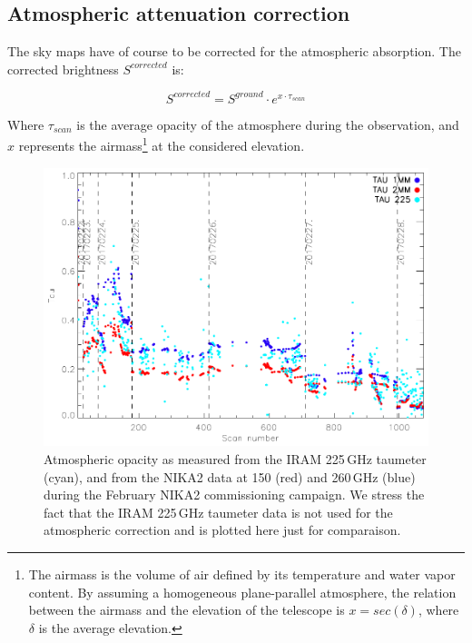 \documentclass[]{aa} %
\begin{document}
\subsection{Atmospheric attenuation correction}
\label{Atmospheric attenuation correction}

The sky maps have of course to be corrected for the atmospheric absorption. The corrected brightness $S^{corrected}$ is:

\begin{equation}
S^{corrected} =  S^{ground} \cdot e^{ x \cdot \tau_{scan}}
\end{equation}

Where $\tau_{scan}$ is the average opacity of the atmosphere during the observation, and $x$ represents the airmass\footnote{The airmass is the volume of air defined by its temperature and water vapor content. By assuming a homogeneous plane-parallel atmosphere, the relation between the airmass and the elevation of the telescope is $x = sec(\delta)$, where $\delta$ is the average elevation.} at the considered elevation.

\begin{figure}
\includegraphics[scale=0.55]{./opacity_evol_run22.pdf}
\caption{Atmospheric opacity as measured from the IRAM 225\,GHz taumeter (cyan), and from the NIKA2 data at 150 (red) and 260\,GHz (blue) during the February NIKA2 commissioning campaign. We stress the fact that the IRAM 225\,GHz taumeter data is not used for the atmospheric correction and is plotted here just for comparaison.
\label{fig:taumeas}}
\end{figure}
\end{document}
